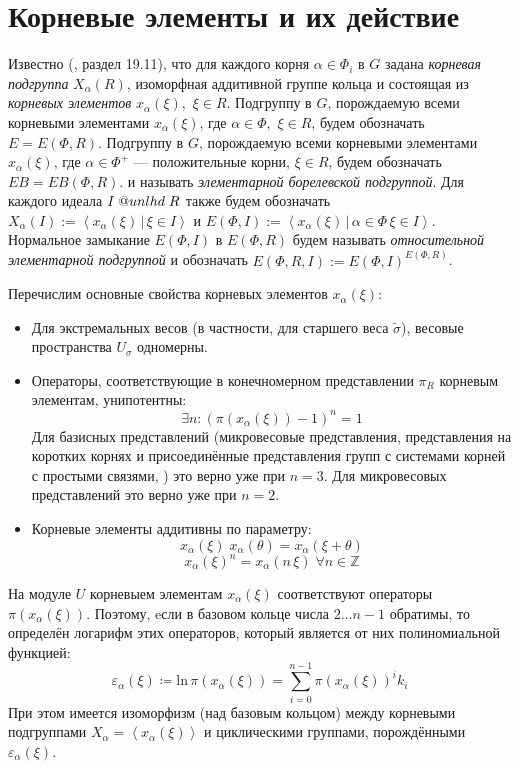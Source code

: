 \documentclass[12pt]{matmex-diploma}
\makeatletter
\newcommand{\slunlhd}{%
  \mathrel{\mathpalette\sl@unlhd\relax}%
}
\newcommand{\sl@unlhd}[2]{%
  \sbox\z@{$#1\lhd$}%
  \sbox\tw@{$#1\leqslant$}%
  \dimen@=\ht\tw@
  \advance\dimen@-\ht\z@
  \ifx#1\displaystyle
    \advance\dimen@ .2pt
  \else
    \ifx#1\textstyle
      \advance\dimen@ .2pt
    \fi
  \fi
  \ooalign{\raisebox{\dimen@}{$\m@th#1\lhd$}\cr$\m@th#1\leqslant$\cr}%
}
\theoremstyle{mystyleni}
\theoremstyle{mystyle}
\newcommand{\Z}{\mathbb{Z}}
\renewcommand{\trianglelefteq}{\slunlhd}
\makeatother
\begin{document}
\section{Корневые элементы и их действие}

Известно (\citep{Milne2017}, раздел 19.11), что для каждого корня $\alpha \in \Phi_i$ в $G$ задана \emph{корневая подгруппа} $X_\alpha(R)$, изоморфная аддитивной группе кольца и состоящая из \emph{корневых элементов} $x_\alpha(\xi)$,~$\xi \in R$. Подгруппу в $G$, порождаемую всеми корневыми элементами $x_\alpha(\xi)$, где $\alpha \in \Phi$,~$\xi \in R$, будем обозначать $E = E(\Phi,R)$. 
Подгруппу в $G$, порождаемую всеми корневыми элементами $x_\alpha(\xi)$, где $\alpha \in \Phi^+$ --- положительные корни, $\xi \in R$, будем обозначать $EB = EB(\Phi,R)$. и называть \emph{элементарной борелевской  подгруппой}.
Для каждого идеала $I \trianglelefteq R$ также будем обозначать
$X_\alpha(I) := \left<x_\alpha(\xi) \,|\, \xi \in I\right>$ и $E(\Phi,I) := \left<x_\alpha(\xi) \,|\, \alpha \in \Phi \, \xi \in I\right>$. Нормальное замыкание $E(\Phi,I)$ в $E(\Phi,R)$ будем называть \emph{относительной элементарной подгруппой} и обозначать $E(\Phi,R,I):=E(\Phi,I)^{E(\Phi,R)}$.

Перечислим основные свойства корневых элементов $x_\alpha(\xi)$:
\begin{itemize}[label={\LARGE\raisebox{-0.4ex}{\textbullet}\;},leftmargin=2\parindent]
\item
Для экстремальных весов (в частности, для старшего веса $\widetilde\sigma$), весовые пространства $U_\sigma$ одномерны.
\item
Операторы, соответствующие в конечномерном представлении $\pi_R$ корневым элементам, унипотентны:
$$\exists n : (\pi(x_\alpha(\xi))-1)^n = 1$$
Для базисных представлений (микровесовые представления, представления на коротких корнях и присоединённые представления групп с системами корней с простыми связями, \cite{Plotkin1998}) это верно уже при $n=3$. Для микровесовых представлений это верно уже при $n=2$.
\item
Корневые элементы аддитивны по параметру:
$$x_\alpha(\xi) \; x_\alpha(\theta)  = x_\alpha(\xi+\theta)$$
$$x_\alpha(\xi)^n = x_\alpha(n \, \xi) \; \forall n \in \Z$$
\end{itemize}

На модуле $U$ корневыем элементам $x_\alpha(\xi)$ соответствуют операторы $\pi(x_\alpha(\xi))$. Поэтому, eсли в базовом кольце числа $2 \ldots n-1$ обратимы, то определён логарифм этих операторов, который является от них полиномиальной функцией:
$$ \varepsilon_\alpha(\xi) \coloneqq \mathrm{ln} \, \pi(x_\alpha(\xi)) = \sum_{i=0}^{n-1} {\pi(x_\alpha(\xi))^i k_i} $$
При этом имеется изоморфизм (над базовым кольцом) между корневыми подгруппами $X_\alpha=\left<x_\alpha(\xi)\right>$ и циклическими группами, порождёнными $\varepsilon_\alpha(\xi)$.
\end{document}
